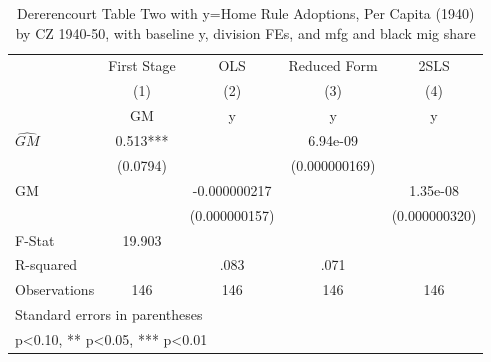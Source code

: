\begin{table}[htbp]\centering
\def\sym#1{\ifmmode^{#1}\else\(^{#1}\)\fi}
\caption{Dererencourt Table Two with y=Home Rule Adoptions, Per Capita (1940) by CZ 1940-50, with baseline y, division FEs, and mfg and black mig share}
\begin{tabular}{l*{4}{c}}
\toprule
                    & First Stage   &         OLS   &Reduced Form   &        2SLS   \\
                    &\multicolumn{1}{c}{(1)}&\multicolumn{1}{c}{(2)}&\multicolumn{1}{c}{(3)}&\multicolumn{1}{c}{(4)}\\
                    &\multicolumn{1}{c}{GM}&\multicolumn{1}{c}{y}&\multicolumn{1}{c}{y}&\multicolumn{1}{c}{y}\\
\midrule
$\hat{GM}$          &       0.513***&               &    6.94e-09   &               \\
                    &    (0.0794)   &               &(0.000000169)   &               \\
\addlinespace
GM                  &               &-0.000000217   &               &    1.35e-08   \\
                    &               &(0.000000157)   &               &(0.000000320)   \\
\midrule
F-Stat              &      19.903   &               &               &               \\
R-squared           &               &        .083   &        .071   &               \\
Observations        &         146   &         146   &         146   &         146   \\
\bottomrule
\multicolumn{5}{l}{\footnotesize Standard errors in parentheses}\\
\multicolumn{5}{l}{\footnotesize * p<0.10, ** p<0.05, *** p<0.01}\\
\end{tabular}
\end{table}
